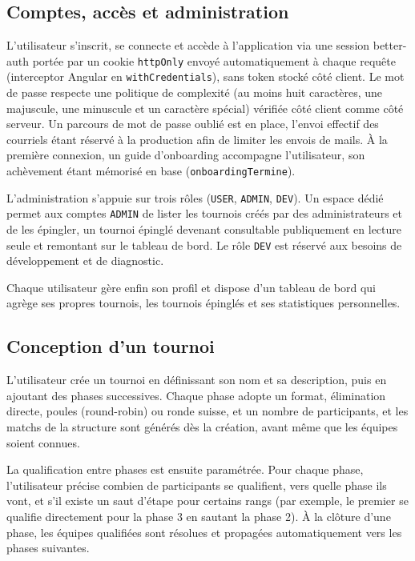 \subsection{Comptes, accès et administration}
L'utilisateur s'inscrit, se connecte et accède à l'application via une session better-auth portée par un cookie \texttt{httpOnly} envoyé automatiquement à chaque requête (interceptor Angular en \texttt{withCredentials}), sans token stocké côté client. Le mot de passe respecte une politique de complexité (au moins huit caractères, une majuscule, une minuscule et un caractère spécial) vérifiée côté client comme côté serveur. Un parcours de mot de passe oublié est en place, l'envoi effectif des courriels étant réservé à la production afin de limiter les envois de mails. À la première connexion, un guide d'onboarding accompagne l'utilisateur, son achèvement étant mémorisé en base (\texttt{onboardingTermine}).

L'administration s'appuie sur trois rôles (\texttt{USER}, \texttt{ADMIN}, \texttt{DEV}). Un espace dédié permet aux comptes \texttt{ADMIN} de lister les tournois créés par des administrateurs et de les épingler, un tournoi épinglé devenant consultable publiquement en lecture seule et remontant sur le tableau de bord. Le rôle \texttt{DEV} est réservé aux besoins de développement et de diagnostic.

Chaque utilisateur gère enfin son profil et dispose d'un tableau de bord qui agrège ses propres tournois, les tournois épinglés et ses statistiques personnelles.

\subsection{Conception d'un tournoi}
L'utilisateur crée un tournoi en définissant son nom et sa description, puis en ajoutant des phases successives. Chaque phase adopte un format, élimination directe, poules (round-robin) ou ronde suisse, et un nombre de participants, et les matchs de la structure sont générés dès la création, avant même que les équipes soient connues.

La qualification entre phases est ensuite paramétrée. Pour chaque phase, l'utilisateur précise combien de participants se qualifient, vers quelle phase ils vont, et s'il existe un saut d'étape pour certains rangs (par exemple, le premier se qualifie directement pour la phase 3 en sautant la phase 2). À la clôture d'une phase, les équipes qualifiées sont résolues et propagées automatiquement vers les phases suivantes.

